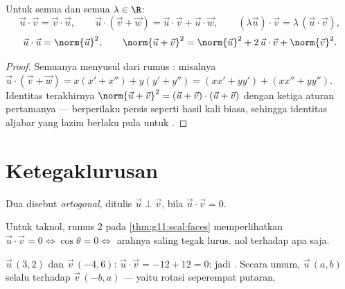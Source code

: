 \begin{proposition}\label{prop:g11:scal:rules}
Untuk semua  dan semua $\lambda \in \R$:
\[
\vec u \cdot \vec v = \vec v \cdot \vec u, \qquad
\vec u \cdot (\vec v + \vec w) = \vec u \cdot \vec v + \vec u \cdot
\vec w, \qquad
(\lambda \vec u)\cdot \vec v = \lambda\,(\vec u \cdot \vec v),
\]
\[
\vec u \cdot \vec u = \norm{\vec u}^2,
\qquad
\norm{\vec u + \vec v}^2 = \norm{\vec u}^2 + 2\,\vec u\cdot\vec v +
\norm{\vec v}^2 .
\]
\end{proposition}

\begin{proof}
Semuanya menyusul dari rumus : misalnya
$\vec u \cdot (\vec v + \vec w) = x(x' + x'') + y(y' + y'') =
(xx' + yy') + (xx'' + yy'')$. Identitas terakhirnya 
$\norm{\vec u + \vec v}^2 = (\vec u + \vec v)\cdot(\vec u + \vec v)$
dengan ketiga aturan pertamanya ---  berperilaku persis
seperti hasil kali biasa, sehingga identitas aljabar yang lazim berlaku pula
untuk .
\end{proof}

\section{Ketegaklurusan}

\begin{definition}\label{def:g11:scal:orthogonal}
Dua  disebut \emph{ortogonal}, ditulis
$\vec u \perp \vec v$, bila $\vec u \cdot \vec v = 0$.
\end{definition}

\begin{remark}
Untuk  taknol, rumus 2 pada \cref{thm:g11:scal:faces} memperlihatkan
$\vec u \cdot \vec v = 0 \iff \cos\theta = 0 \iff$ arahnya saling
tegak lurus.  nol  terhadap apa saja.
\end{remark}

\begin{example}
$\vec u\,(3, 2)$ dan $\vec v\,(-4, 6)$: $\vec u \cdot \vec v = -12 + 12 =
0$: jadi . Secara umum, $\vec u\,(a, b)$ selalu  terhadap
$\vec v\,(-b, a)$ --- yaitu rotasi seperempat putaran.
\end{example}

